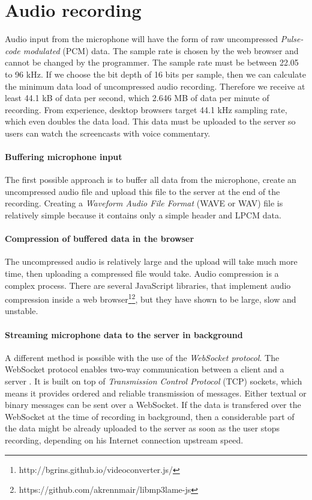 \section{Audio recording}
Audio input from the microphone will have the form of raw uncompressed \textit{Pulse-code modulated} (PCM) data\cite{mic_pcm}. The sample rate is chosen by the web browser and cannot be changed by the programmer. The sample rate must be between 22.05 to 96 kHz. If we choose the bit depth of 16 bits per sample, then we can calculate the minimum data load of uncompressed audio recording. Therefore we receive at least 44.1 kB of data per second, which 2.646 MB of data per minute of recording. From experience, desktop browsers target 44.1 kHz sampling rate, which even doubles the data load. This data must be uploaded to the server so users can watch the screencasts with voice commentary.

\paragraph{Buffering microphone input} The first possible approach is to buffer all data from the microphone, create an uncompressed audio file and upload this file to the server at the end of the recording. Creating a \textit{Waveform Audio File Format} (WAVE or WAV) file is relatively simple because it contains only a simple header and LPCM data.

\paragraph{Compression of buffered data in the browser} The uncompressed audio is relatively large and the upload will take much more time, then uploading a compressed file would take. Audio compression is a complex process. There are several JavaScript libraries, that implement audio compression inside a web browser\footnote{http://bgrins.github.io/videoconverter.js/}\footnote{https://github.com/akrennmair/libmp3lame-js}, but they have shown to be large, slow and unstable.

\paragraph{Streaming microphone data to the server in background} A different method is possible with the use of the \textit{WebSocket protocol}. The WebSocket protocol enables two-way communication between a client and a server \cite{websocket}. It is built on top of \textit{Transmission Control Protocol} (TCP) sockets, which means it provides ordered and reliable transmission of messages. Either textual or binary messages can be sent over a WebSocket. If the data is transfered over the WebSocket at the time of recording in background, then a considerable part of the data might be already uploaded to the server as soon as the user stops recording, depending on his Internet connection upstream speed.


